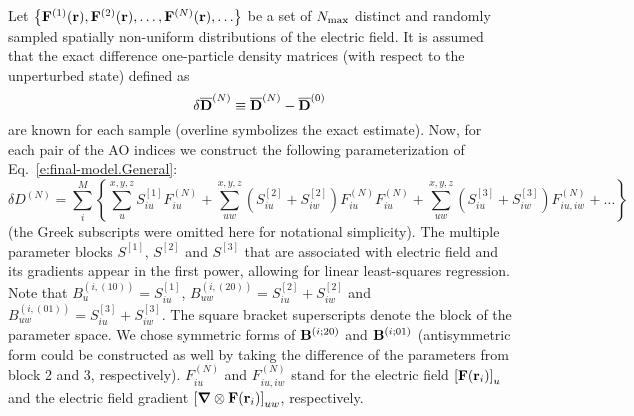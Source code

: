 \documentclass[aip,graphicx]{revtex4-1}
\newcommand{\BM}[1]{\bm{#1}}
\begin{document}
Let  
$\left\{ {\bf F}^{(1)}({\bf r}), {\bf F}^{(2)}({\bf r}), \ldots, {\bf F}^{(N)}({\bf r}), \ldots \right\}$ 
be a set of $N_{\rm max}$ distinct and randomly sampled 
spatially non\hyp{}uniform distributions of the electric field. It is assumed that
the exact difference one\hyp{}particle density matrices (with respect to the unperturbed state)
defined as
%
\begin{equation}
 \delta \overline{\bf D}^{(N)} \equiv \overline{\bf D}^{(N)} - \overline{\bf D}^{(0)}
\end{equation}
%
are known for each sample (overline symbolizes the exact estimate).
Now, for each pair of the AO indices we construct the following 
parameterization of Eq.~\eqref{e:final-model.General}:
%
\begin{equation}\label{e:final-model.General.Parameters}
 \delta D^{(N)} = \sum_{i }^M \left\{ 
                              \sum_u^{x,y,z} S^{[1]}_{iu} F_{iu}^{(N)} 
                +             \sum_{uw}^{x,y,z} \left( S^{[2]}_{iu} + S^{[2]}_{iw} \right) F_{iu}^{(N)} F_{iu}^{(N)}
                +             \sum_{uw}^{x,y,z} \left( S^{[3]}_{iu} + S^{[3]}_{iw}\right) F_{iu,iw}^{(N)}
                        + \ldots \right\}
\end{equation}
%
(the Greek subscripts were omitted here for notational simplicity).
The multiple parameter blocks 
$S^{[1]}$, $S^{[2]}$ and $S^{[3]}$ that are associated with electric field and its gradients
appear in the first power, allowing for linear least\hyp{}squares regression.
Note that $B_u^{(i,(10))} = S^{[1]}_{iu}$, $B_{uw}^{(i,(20))} = S^{[2]}_{iu} + S^{[2]}_{iw}$
and $B_{uw}^{(i,(01))} = S^{[3]}_{iu} + S^{[3]}_{iw}$. The square bracket superscripts 
denote the block of the parameter space. We chose symmetric forms of ${\bf B}^{(i;20)}$
and ${\bf B}^{(i;01)}$ (antisymmetric form could be constructed as well by taking the difference
of the parameters from block 2 and 3, respectively). $F_{iu}^{(N)}$ and $F_{iu,iw}^{(N)}$ 
stand for the electric field $\left[ {\bf F}({\bf r}_i)\right]_u$ and the electric field
gradient $\left[ {\BM \nabla} \otimes {\bf F}({\bf r}_i) \right]_{uw}$, respectively.
\end{document}
